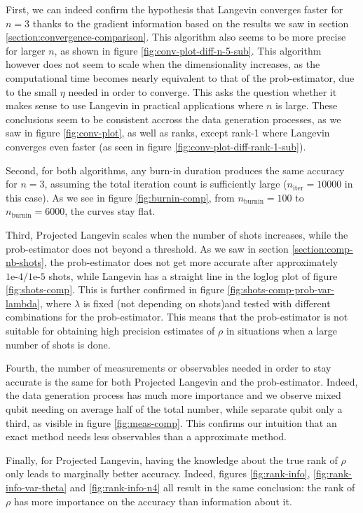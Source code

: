 \documentclass[12pt]{memoir}
\newcommand{\nitern}[1]{$n_{\text{iter}}=#1$}
\newcommand{\nburninn}[1]{$n_{\text{burnin}}=#1$}
\begin{document}
First, we can indeed confirm the hypothesis that Langevin converges faster for $n=3$ thanks to the gradient information based on the results we saw in section \ref{section:convergence-comparison}. This algorithm also seems to be more precise for larger $n$, as shown in figure \ref{fig:conv-plot-diff-n-5-sub}. This algorithm however does not seem to scale when the dimensionality increases, as the computational time becomes nearly equivalent to that of the prob-estimator, due to the small $\eta$ needed in order to converge. This asks the question whether it makes sense to use Langevin in practical applications where $n$ is large. These conclusions seem to be consistent accross the data generation processes, as we saw in figure \ref{fig:conv-plot}, as well as ranks, except rank-1 where Langevin converges even faster (as seen in figure \ref{fig:conv-plot-diff-rank-1-sub}).\medbreak

Second, for both algorithms, any burn-in duration produces the same accuracy for $n=3$, assuming the total iteration count is sufficiently large (\nitern{10000} in this case). As we see in figure \ref{fig:burnin-comp}, from \nburninn{100} to \nburninn{6000}, the curves stay flat.\medbreak

Third, Projected Langevin scales when the number of shots increases, while the prob-estimator does not beyond a threshold. As we saw in section \ref{section:comp-nb-shots}, the prob-estimator does not get more accurate after approximately $1\text{e-}4/1\text{e-}5$ shots, while Langevin has a straight line in the loglog plot of figure \ref{fig:shots-comp}. This is further confirmed in figure \ref{fig:shots-comp-prob-var-lambda}, where $\lambda$ is fixed (not depending on shots)and tested with different combinations for the prob-estimator. This means that the prob-estimator is not suitable for obtaining high precision estimates of $\rho$ in situations when a large number of shots is done.\medbreak

Fourth, the number of measurements or observables needed in order to stay accurate is the same for both Projected Langevin and the prob-estimator. Indeed, the data generation process has much more importance and we observe mixed qubit needing on average half of the total number, while separate qubit only a third, as visible in figure \ref{fig:meas-comp}. This confirms our intuition that an exact method needs less observables than a approximate method.\medbreak

Finally, for Projected Langevin, having the knowledge about the true rank of $\rho$ only leads to marginally better accuracy. Indeed, figures \ref{fig:rank-info}, \ref{fig:rank-info-var-theta} and \ref{fig:rank-info-n4} all result in the same conclusion: the rank of $\rho$ has more importance on the accuracy than information about it.
\end{document}
